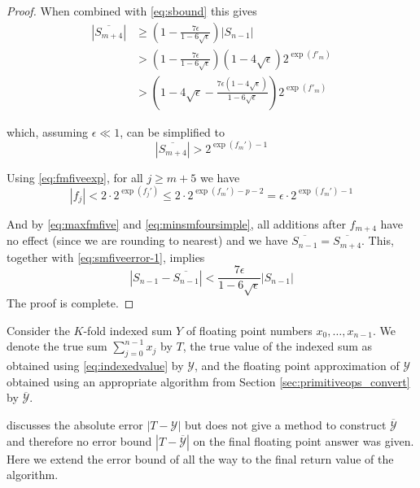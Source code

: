 \begin{proof}
      When combined with \eqref{eq:sbound} this gives
      \begin{align*}
        \left|\overline{S_{m+4}}\right|
        & \geq \left(1-\frac{7 \epsilon}{1-6\sqrt{\epsilon}}\right) |S_{n-1}| \\
        & > \left(1-\frac{7 \epsilon}{1-6\sqrt{\epsilon}}\right) \left(1-4\sqrt{\epsilon}\right) 2^{\exp(f'_m)} \\
        & > \left(1-4\sqrt{\epsilon} - \frac{7 \epsilon \left(1-4\sqrt{\epsilon}\right)}{1-6\sqrt{\epsilon}}\right) 2^{\exp(f'_m)}
      \end{align*}

      which, assuming $\epsilon \ll 1$, can be simplified to
      \begin{equation}
        \left|\overline{S_{m + 4}}\right| > 2^{\exp(f_m') - 1}
        \label{eq:minsmfoursimple}
      \end{equation}

      Using  \eqref{eq:fmfiveexp}, for all $j \geq m + 5$ we have
      \begin{equation}
        |f_j| < 2 \cdot 2^{\exp(f_j')} \leq 2 \cdot 2^{\exp(f_m') - p - 2} = \epsilon \cdot 2^{\exp(f_m') - 1}
        \label{eq:maxfmfive}
      \end{equation}

      And by \eqref{eq:maxfmfive} and \eqref{eq:minsmfoursimple}, all additions
      after $f_{m + 4}$ have no effect (since we are rounding to nearest)
      and we have $\overline{S_{n-1}} = \overline{S_{m+4}}$.
      This, together with \eqref{eq:smfiveerror-1}, implies
      \begin{equation*}
        \left|S_{n-1} - \overline{S_{n-1}}\right| < \frac{7\epsilon}{1-6\sqrt{\epsilon}} |S_{n-1}|
      \end{equation*}
      The proof is complete.
    \end{proof}

    Consider the $K$-fold indexed sum $Y$ of floating point numbers $x_0, \ldots, x_{n - 1}$.
    We denote the true sum $\sum \limits_{j = 0}^{n - 1} x_j$ by $T$, the true
    value of the indexed sum as obtained using \eqref{eq:indexedvalue} by
    $\mathcal{Y}$, and the floating point approximation of $\mathcal{Y}$
    obtained using an appropriate algorithm from Section
    \ref{sec:primitiveops_convert} by $\overline{\mathcal{Y}}$.

    \cite{repsum} discusses the absolute error $|T - \mathcal{Y}|$ but does not
    give a method to construct $\overline{\mathcal{Y}}$ and therefore no error
    bound $|T - \overline{\mathcal{Y}}|$ on the final floating point answer
    was given. Here we extend the error bound of \cite{repsum} all the way to
    the final return value of the algorithm.

